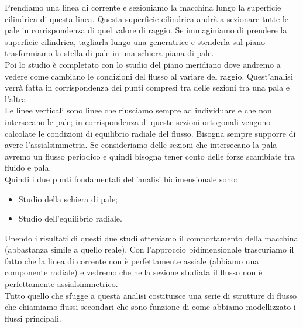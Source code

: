 Prendiamo una linea di corrente e sezioniamo la macchina lungo la superficie cilindrica di questa linea. Questa superficie cilindrica andrà a sezionare tutte le pale in corrispondenza di quel valore di raggio. Se immaginiamo di prendere la superficie cilindrica, tagliarla lungo una generatrice e stenderla sul piano trasformiamo la stella di pale in una schiera piana di pale.\\
Poi lo studio è completato con lo studio del piano meridiano dove andremo a vedere come cambiano le condizioni del flusso al variare del raggio. Quest'analisi verrà fatta in corrispondenza dei punti compresi tra delle sezioni tra una pala e l’altra.\\
Le linee verticali sono linee che riusciamo sempre ad individuare e che non intersecano le pale; in corrispondenza di queste sezioni ortogonali vengono calcolate le condizioni di equilibrio radiale del flusso. Bisogna sempre supporre di avere l'assialsimmetria. Se consideriamo delle sezioni che intersecano la pala avremo un flusso periodico e quindi bisogna
tener conto delle forze scambiate tra fluido e pala.\\
Quindi i due punti fondamentali dell'analisi bidimensionale sono:
\begin{itemize}
\item Studio della schiera di pale;
\item Studio dell'equilibrio radiale.
\end{itemize}
Unendo i risultati di questi due studi otteniamo il comportamento della macchina (abbastanza simile a quello reale).
Con l’approccio bidimensionale trascuriamo il fatto che la linea di corrente non è perfettamente assiale (abbiamo una componente radiale) e vedremo che nella sezione studiata il flusso non è perfettamente assialsimmetrico.\\
Tutto quello che sfugge a questa analisi costituisce una serie di strutture di flusso che chiamiamo flussi secondari che sono funzione di come abbiamo modellizzato i flussi principali.
